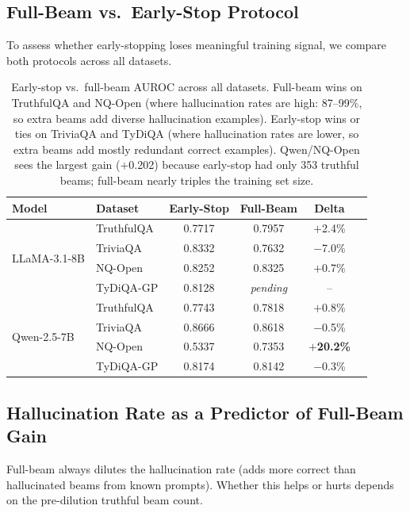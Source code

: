\documentclass[11pt,a4paper]{article}
\begin{document}
\subsection{Full-Beam vs.\ Early-Stop Protocol}

To assess whether early-stopping loses meaningful training signal, we compare
both protocols across all datasets.

\begin{table}[h]
\centering
\small
\begin{tabular}{llcccc}
\toprule
\textbf{Model} & \textbf{Dataset} & \textbf{Early-Stop} & \textbf{Full-Beam} & \textbf{Delta} \\
\midrule
\multirow{4}{*}{LLaMA-3.1-8B}
  & TruthfulQA & 0.7717 & 0.7957 & \textcolor{upgreen}{$+$2.4\%} \\
  & TriviaQA   & 0.8332 & 0.7632 & \textcolor{downred}{$-$7.0\%} \\
  & NQ-Open    & 0.8252 & 0.8325 & \textcolor{upgreen}{$+$0.7\%} \\
  & TyDiQA-GP  & 0.8128 & \textit{pending} & -- \\
\midrule
\multirow{4}{*}{Qwen-2.5-7B}
  & TruthfulQA & 0.7743 & 0.7818 & \textcolor{upgreen}{$+$0.8\%} \\
  & TriviaQA   & 0.8666 & 0.8618 & \textcolor{downred}{$-$0.5\%} \\
  & NQ-Open    & 0.5337 & 0.7353 & \textcolor{upgreen}{$+$\textbf{20.2\%}} \\
  & TyDiQA-GP  & 0.8174 & 0.8142 & \textcolor{downred}{$-$0.3\%} \\
\bottomrule
\end{tabular}
\caption{Early-stop vs.\ full-beam AUROC across all datasets.  Full-beam wins
         on TruthfulQA and NQ-Open (where hallucination rates are high: 87--99\%,
         so extra beams add diverse hallucination examples).  Early-stop wins or
         ties on TriviaQA and TyDiQA (where hallucination rates are lower, so
         extra beams add mostly redundant correct examples).  Qwen/NQ-Open sees
         the largest gain ($+$0.202) because early-stop had only 353 truthful
         beams; full-beam nearly triples the training set size.}
\end{table}

\subsection{Hallucination Rate as a Predictor of Full-Beam Gain}

Full-beam always dilutes the hallucination rate (adds more correct than
hallucinated beams from known prompts).  Whether this helps or hurts
depends on the pre-dilution truthful beam count.
\end{document}
